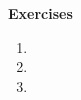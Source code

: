 \noindent \textbf{Exercises}


\begin{enumerate}
	\item 
	
	\item 
	
	\item 
	
\end{enumerate}

\pagebreak
